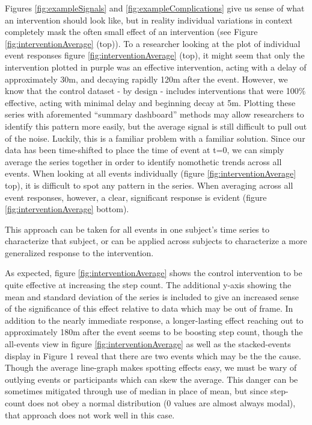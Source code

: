 Figures \ref{fig:exampleSignals} and \ref{fig:exampleComplications} give us sense of what an intervention should look like, but in reality individual variations in context completely mask the often small effect of an intervention (see Figure \ref{fig:interventionAverage} (top)).
To a researcher looking at the plot of individual event responses figure \ref{fig:interventionAverage} (top), it might seem that only the intervention plotted in purple was an effective intervention, acting with a delay of approximately 30m, and decaying rapidly 120m after the event.
However, we know that the control dataset - by design - includes interventions that were 100\% effective, acting with minimal delay and beginning decay at 5m.
Plotting these series with aforemented ``summary dashboard'' methods may allow researchers to identify this pattern more easily, but the average signal is still difficult to pull out of the noise.
Luckily, this is a familiar problem with a familiar solution.
Since our data has been time-shifted to place the time of event at t=0, we can simply average the series together in order to identify nomothetic trends across all events.
When looking at all events individually (figure \ref{fig:interventionAverage} top), it is difficult to spot any pattern in the series.
When averaging across all event responses, however, a clear, significant response is evident (figure \ref{fig:interventionAverage} bottom).

This approach can be taken for all events in one subject's time series to characterize that subject, or can be applied across subjects to characterize a more generalized response to the intervention.

As expected, figure \ref{fig:interventionAverage} shows the control intervention to be quite effective at increasing the step count.
The additional y-axis showing the mean and standard deviation of the series is included to give an increased sense of the significance of this effect relative to data which may be out of frame.
In addition to the nearly immediate response, a longer-lasting effect reaching out to approximately 180m after the event seems to be boosting step count, though the all-events view in figure \ref{fig:interventionAverage} as well as the stacked-events display in Figure 1 reveal that there are two events which may be the the cause.
Though the average line-graph makes spotting effects easy, we must be wary of outlying events or participants which can skew the average.
This danger can be sometimes mitigated through use of median in place of mean, but since step-count does not obey a normal distribution (0 values are almost always modal), that approach does not work well in this case.

